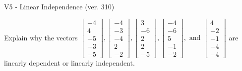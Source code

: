 \begin{exercise}
  \begin{exerciseTitle}V5 - Linear Independence (ver. 310)\end{exerciseTitle}
  \begin{exerciseStatement}
    Explain why the vectors \(\left[\begin{array}{r}
-4 \\
4 \\
-5 \\
-3 \\
-5
\end{array}\right] , \left[\begin{array}{r}
-4 \\
-3 \\
-4 \\
2 \\
-2
\end{array}\right] , \left[\begin{array}{r}
3 \\
-6 \\
2 \\
2 \\
-5
\end{array}\right] , \left[\begin{array}{r}
-4 \\
-6 \\
5 \\
-1 \\
-2
\end{array}\right] , \text{ and } \left[\begin{array}{r}
4 \\
-2 \\
-1 \\
-4 \\
-4
\end{array}\right]\) are linearly dependent or linearly independent.	



\end{exerciseStatement}
\end{exercise}
